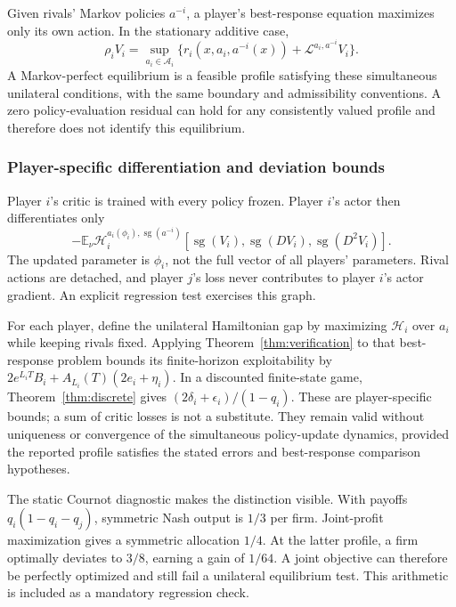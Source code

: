 \documentclass[ecta,nameyear,draft]{econsocart}
\theoremstyle{definition}
\theoremstyle{remark}
\newcommand{\E}{\mathbb E}
\newcommand{\HH}{\mathcal H}
\newcommand{\LL}{\mathcal L}
\newcommand{\Act}{\mathcal A}
\newcommand{\sg}{\operatorname{sg}}
\begin{document}
Given rivals' Markov policies $a^{-i}$, a player's best-response equation maximizes only its own action. In the stationary additive case,
\begin{equation}\label{eq:game}
 \rho_i V_i=\sup_{a_i\in\Act_i}\{r_i(x,a_i,a^{-i}(x))+\LL^{a_i,a^{-i}}V_i\}.
\end{equation}
A Markov-perfect equilibrium is a feasible profile satisfying these simultaneous unilateral conditions, with the same boundary and admissibility conventions. A zero policy-evaluation residual can hold for any consistently valued profile and therefore does not identify this equilibrium.

\subsubsection{Player-specific differentiation and deviation bounds}
Player $i$'s critic is trained with every policy frozen. Player $i$'s actor then differentiates only
\begin{equation}\label{eq:gameactor}
 -\E_\nu\HH_i^{a_i(\phi_i),\sg(a^{-i})}
       [\sg(V_i),\sg(DV_i),\sg(D^2V_i)].
\end{equation}
The updated parameter is $\phi_i$, not the full vector of all players' parameters. Rival actions are detached, and player $j$'s loss never contributes to player $i$'s actor gradient. An explicit regression test exercises this graph.

For each player, define the unilateral Hamiltonian gap by maximizing $\HH_i$ over $a_i$ while keeping rivals fixed. Applying Theorem~\ref{thm:verification} to that best-response problem bounds its finite-horizon exploitability by $2e^{L_iT}B_i+A_{L_i}(T)(2e_i+\eta_i)$. In a discounted finite-state game, Theorem~\ref{thm:discrete} gives $(2\delta_i+\epsilon_i)/(1-q_i)$. These are player-specific bounds; a sum of critic losses is not a substitute. They remain valid without uniqueness or convergence of the simultaneous policy-update dynamics, provided the reported profile satisfies the stated errors and best-response comparison hypotheses.

The static Cournot diagnostic makes the distinction visible. With payoffs $q_i(1-q_i-q_j)$, symmetric Nash output is $1/3$ per firm. Joint-profit maximization gives a symmetric allocation $1/4$. At the latter profile, a firm optimally deviates to $3/8$, earning a gain of $1/64$. A joint objective can therefore be perfectly optimized and still fail a unilateral equilibrium test. This arithmetic is included as a mandatory regression check.
\end{document}
